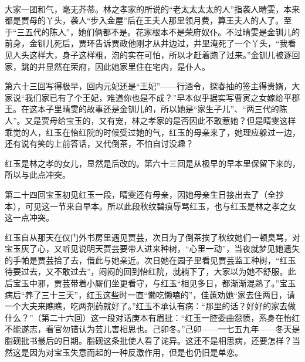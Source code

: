 \par 大家一团和气，毫无芥蒂。林之孝家的所说的“老太太太太的人”指袭人晴雯，本来都是贾母的丫头，袭人“步入金屋”后在王夫人那里领月费，算王夫人的人了。至于“三五代的陈人”，她们俩都不是。花家根本不是荣府奴仆。不过晴雯是金钏儿的前身，金钏儿死后，贾环告诉贾政他刚才从井边过，井里淹死了一个丫头，“我看见人头这样大，身子这样粗，泡的实在可怕，所以才赶着跑了过来。”金钏儿被逐回家，跳的井显然在荣府，因此她家里住在宅内，是仆人。
\par 第六十三回写得极早，回内元妃还是“王妃”——行酒令，探春抽的签主得贵婿，大家说“我们家已有了个王妃，难道你也是不成？”早本似乎据实写曹寅之女嫁给平郡王。在这本子里晴雯的故事还是金钏儿的，所以她是“家生子儿”、“两三代的陈人”。又是贾母给宝玉的，又有宠，林之孝家的是否因此不敢惹她？但是晴雯这样乖觉的人，红玉在怡红院的时候受过她的气，红玉的母亲来了，她理应躲过一边，还有说有笑的上前答话，又代倒茶，不怕自讨没趣？
\par 红玉是林之孝的女儿，显然是后改的。第六十三回是从极早的早本里保留下来的，所以与此点冲突。
\par 第二十四回宝玉初见红玉一段，晴雯还有母亲，因她母亲生日接出去了（全抄本），可见这一节来自早本。所以此段秋纹碧痕辱骂红玉，也与红玉是林之孝之女这一点冲突。
\par 红玉自从那天在仪门外书房里遇见贾芸，次日为了倒茶挨了秋纹她们一顿臭骂，对宝玉灰了心，又听见说明天贾芸要带人进来种树，“心里一动”，当夜就梦见她遗失的手帕是贾芸拾了去，借此与她亲近。次日她在园子里看见贾芸监工种树，“红玉待要过去，又不敢过去”，闷闷的回到怡红院，就躺下了，大家以为她不舒服。此后宝玉中邪，贾芸带着小厮们坐更看守，与红玉“相见多日，都渐渐混熟了。”宝玉病后“养了三十三天”，红玉这些时一直“懒吃懒嗑的”，佳蕙劝她“家去住两日，请一个大夫来瞧瞧，吃两剂药就好了。”红玉不承认有病：“那里的话？好好的家去做什么？”（第二十六回）这一段对话庚本有眉批：“红玉一腔委曲怨愤，系身在怡红不能遂志，看官勿错认为芸儿害相思也。己卯冬。”己卯——一七五九年——冬天是脂砚批书最后的日期。脂砚这条批使人看了诧异。这还不是相思病，还要怎样？当然这是因为对宝玉失意而起的一种反激作用，但是也仍旧是单恋。
